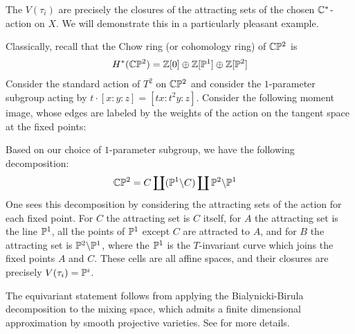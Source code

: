 The $V(\tau_i)$ are precisely the closures of the attracting sets
of the chosen $\C^*$-action on $X$. We will demonstrate this in a particularly
pleasant example.
\begin{example}
	Classically, recall that the Chow ring (or cohomology ring) of
	$\C\P^2$ is \begin{align*}
		H^*(\C\P^2) = \Z[0] \oplus \Z[\P^1] \oplus \Z[\P^2]
	\end{align*} Consider the standard action of $T^2$ on $\C\P^2$
	and consider the $1$-parameter subgroup acting by $t\cdot[x:y:z] = [tx:t^2y:z]$.
	Consider the following moment image, whose
	edges are labeled by the weights of the action on the tangent space at the fixed points:

	\begin{center}
	\end{center}
	Based on our choice of $1$-parameter subgroup, we have the following decomposition: \begin{align*}
		\C\P^2 & = C \coprod (\P^1 \backslash C) \coprod \P^2 \backslash \P^1
	\end{align*} One sees this decomposition by considering
	the attracting sets of the action for each fixed point. For $C$ the
	attracting set is $C$ itself, for $A$ the attracting set is the line $\P^1$,
	all the points of $\P^1$ except $C$ are attracted to $A$, and for $B$ the attracting
	set is $\P^2 \backslash \P^1$, where the $\P^1$ is the $T$-invariant curve which joins the fixed points $A$ and $C$. These cells are all affine spaces, and their
	closures are precisely $V(\tau_i) = \P^i$.
\end{example}
The equivariant statement follows from applying the Bialynicki-Birula decomposition
to the mixing space, which admits a finite dimensional approximation by smooth
projective varieties. See \cite{fulton-anderson} for more details.

